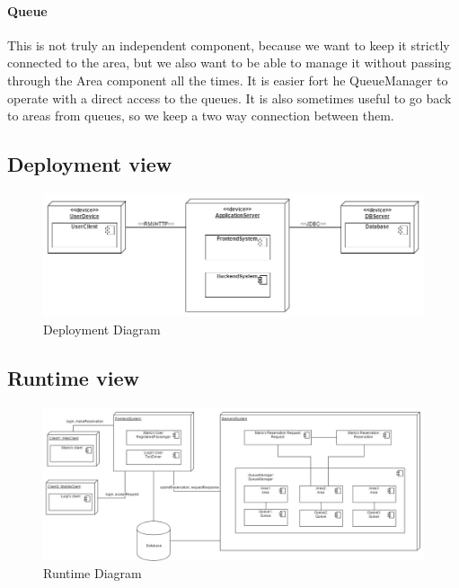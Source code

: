 		\paragraph{Queue}
		This is not truly an independent component, because we want to keep it strictly connected to the area,
		but we also want to be able to manage it without passing through the Area component all the times.
		It is easier fort he QueueManager to operate with a direct access to the queues.
		It is also sometimes useful to go back to areas from queues, so we keep a two way connection between them.
	\begin{landscape}
	\subsection{Deployment view}
		\begin{figure}[h!]
			\begin{center}
				\includegraphics[width=0.9\linewidth]{../SE2_IMAGES/DeploymentDiagram}
				\caption{Deployment Diagram}
			\end{center}
		\end{figure}
	\end{landscape}
	\newpage
	\begin{landscape}
	\subsection{Runtime view}
		\begin{figure}[h!]
			\begin{center}
				\includegraphics[width=0.9\linewidth]{../SE2_IMAGES/RuntimeDiagram}
				\caption{Runtime Diagram}
			\end{center}
		\end{figure}
	\end{landscape}
	\newpage
